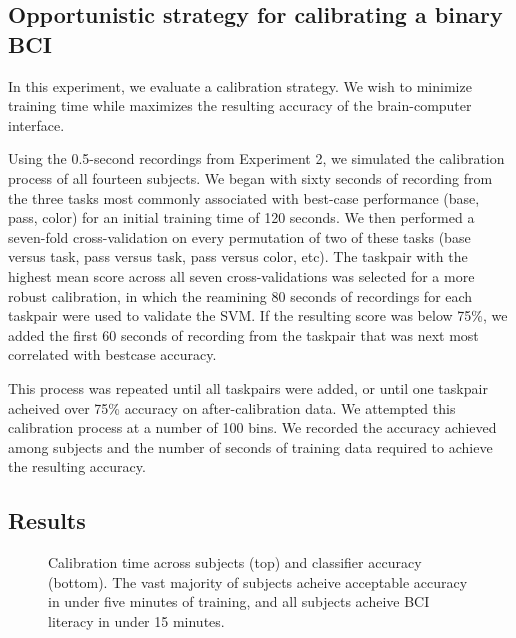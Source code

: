\subsection{Opportunistic strategy for calibrating a binary BCI}

In this experiment, we evaluate a calibration strategy. We wish to minimize training time while maximizes the resulting accuracy of the brain-computer interface.

Using the 0.5-second recordings from Experiment 2, we simulated the calibration process of all fourteen subjects. We began with sixty seconds of recording from the three tasks most commonly associated with best-case performance (base, pass, color) for an initial training time of 120 seconds. We then performed a seven-fold cross-validation on every permutation of two of these tasks (base versus task, pass versus task, pass versus color, etc). The taskpair with the highest mean score across all seven cross-validations was selected for a more robust calibration, in which the reamining 80 seconds of recordings for each taskpair were used to validate the SVM. If the resulting score was below 75\%, we added the first 60 seconds of recording from the taskpair that was next most correlated with bestcase accuracy. 

This process was repeated until all taskpairs were added, or until one taskpair acheived over 75\% accuracy on after-calibration data. We attempted this calibration process at a number of 100 bins. We recorded the accuracy achieved among subjects and the number of seconds of training data required to achieve the resulting accuracy.

\subsection{Results}

\begin{figure}[!h]
  \vspace{-0.2cm}
  \centering
   {}
  \caption{Calibration time across subjects (top) and classifier accuracy (bottom). The vast majority of subjects acheive acceptable accuracy in under five minutes of training, and all subjects acheive BCI literacy in under 15 minutes. }
  \label{fig:fig2}
  \vspace{-0.1cm}
\end{figure}





